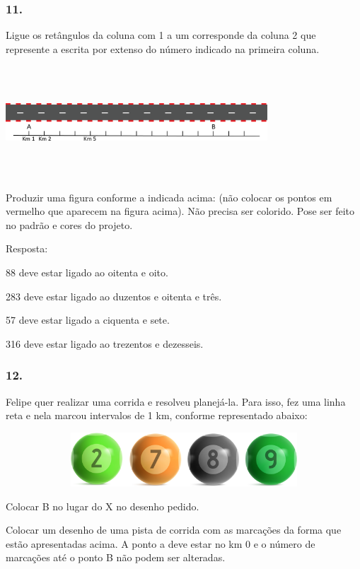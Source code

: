 \subsubsection{11.}\label{section-10}

Ligue os retângulos da coluna com 1 a um corresponde da coluna 2 que
represente a escrita por extenso do número indicado na primeira coluna.

\includegraphics[width=3.85033in,height=1.64181in]{media/image6.png}

Produzir uma figura conforme a indicada acima: (não colocar os pontos em
vermelho que aparecem na figura acima). Não precisa ser colorido. Pose
ser feito no padrão e cores do projeto.

Resposta:

88 deve estar ligado ao oitenta e oito.

283 deve estar ligado ao duzentos e oitenta e três.

57 deve estar ligado a ciquenta e sete.

316 deve estar ligado ao trezentos e dezesseis.

\subsubsection{12.}\label{section-11}

Felipe quer realizar uma corrida e resolveu planejá-la. Para isso, fez
uma linha reta e nela marcou intervalos de 1 km, conforme representado
abaixo:

\includegraphics[width=5.90556in,height=0.79514in]{media/image7.png}

Colocar B no lugar do X no desenho pedido.

Colocar um desenho de uma pista de corrida com as marcações da forma que
estão apresentadas acima. A ponto a deve estar no km 0 e o número de
marcações até o ponto B não podem ser alteradas.

